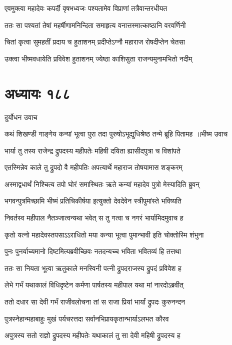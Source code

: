 \twolineshloka
{एवमुक्त्वा महादेवः कपर्दी वृषभध्वजः}
{पश्यतामेव विप्राणां तत्रैवान्तरधीयत}


\twolineshloka
{ततः सा पश्यतां तेषां महर्षीणामनिन्दिता}
{समाहृत्य वनात्तस्मात्काष्ठानि वरवर्णिनी}


\twolineshloka
{चितां कृत्वा सुमहतीं प्रदाय च हुताशनम्}
{प्रदीप्तेऽग्नौ महाराज रोषदीप्तेन चेतसा}


\twolineshloka
{उक्त्वा भीष्मवधायेति प्रविवेश हुताशनम्}
{ज्येष्ठा काशिसुता राजन्यमुनामभितो नदीम्}


\chapter{अध्यायः १८८}
\twolineshloka
{दुर्योधन उवाच}
{}


\threelineshloka
{कथं शिखण्डी गाङ्गेय कन्यां भूत्वा पुरा तदा}
{पुरुषोऽभूद्युधिश्रेष्ठ तन्मे ब्रूहि पितामह ॥भीष्म उवाच}
{}


\twolineshloka
{भार्या तु तस्य राजेन्द्र द्रुपदस्य महीपतेः}
{महिषी दयिता ह्यासीदपुत्रा च विशांपते}


\twolineshloka
{एतस्मिन्नेव काले तु द्रुपदो वै महीपतिः}
{अपत्यार्थे महाराज तोषयामास शङ्करम्}


\twolineshloka
{अस्माद्वधार्थं निश्चित्य तपो घोरं समास्थितः}
{ऋते कन्यां महादेव पुत्रो मेस्यादिति ब्रुवन्}


\twolineshloka
{भगवन्पुत्रमिच्छामि भीष्मं प्रतिचिकीर्षया}
{इत्युक्तो देवदेवेन स्त्रीपुमांस्ते भविष्यति}


\twolineshloka
{निवर्तस्व महीपाल नैतञ्जात्वन्यथा भवेत्}
{स तु गत्वा च नगरं भार्यामिदमुवाच ह}


\twolineshloka
{कृतो यत्नो महादेवस्तपसाऽऽराधितो मया}
{कन्या भूत्वा पुमान्भावी इति चोक्तोस्मि शंभुना}


\twolineshloka
{पुनः पुनर्याच्यमानो दिष्टमित्यब्रवीच्छिवः}
{नतदन्यच्च भविता भवितव्यं हि तत्तथा}


\twolineshloka
{ततः सा नियता भूत्वा ऋतुकाले मनस्विनी}
{पत्नी द्रुपदराजस्य द्रुपदं प्रविवेश ह}


\twolineshloka
{लेभे गर्भं यथाकालं विधिदृष्टेन कर्मणा}
{पार्षतस्य महीपाल यथा मां नारदोऽब्रवीत्}


\twolineshloka
{ततो दधार सा देवी गर्भं राजीवलोचना}
{तां स राजा प्रियां भार्यां द्रुपदः कुरुनन्दन}


\twolineshloka
{पुत्रस्नेहान्महाबाहुः मुखं पर्यचरत्तदा}
{सर्वानभिप्रायकृतान्भार्याऽलभत कौरव}


\twolineshloka
{अपुत्रस्य सतो राज्ञो द्रुपदस्य महीपतेः}
{यथाकालं तु सा देवी महिषी द्रुपदस्य ह}


